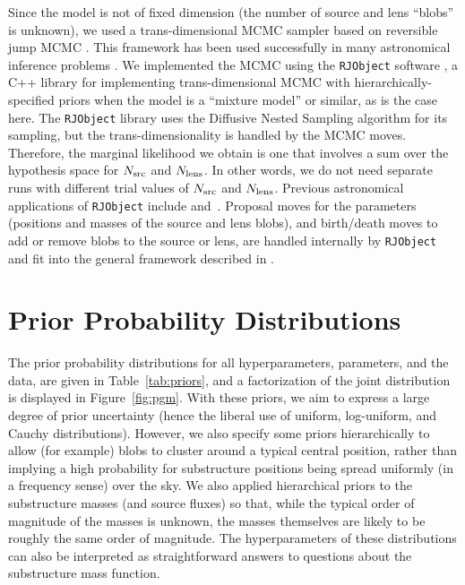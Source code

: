 \documentclass[useAMS,usenatbib]{mn2e}
\begin{document}
Since the model is not of fixed dimension (the number of source and lens
``blobs'' is unknown), we used a trans-dimensional MCMC sampler based on
reversible jump MCMC \citep{green}. This framework has been used successfully
in many astronomical inference problems \citep[e.g.][]{jones, renate}.
We implemented the MCMC using the
{\tt RJObject} software \citep{rjobject}, a C++ library for implementing trans-dimensional MCMC with hierarchically-specified priors when the model is
a ``mixture model'' or similar, as is the case here.
The {\tt RJObject} library uses the
Diffusive Nested Sampling algorithm \citep[DNS][]{dnest} for its sampling, but the
trans-dimensionality is handled by the MCMC moves. Therefore, the marginal
likelihood we obtain is one that involves a sum over the hypothesis space
for $N_{\rm src}$ and $N_{\rm lens}$. In other words, we do not need
separate runs with different trial values of $N_{\rm src}$ and $N_{\rm lens}$.
Previous astronomical
applications of {\tt RJObject} include \citet{magnetron}
and~\citet{exoplanet}. Proposal moves for the parameters (positions and masses
of the source and lens blobs), and birth/death moves to add or remove blobs
to the source or lens, are handled internally by {\tt RJObject} and
fit into the general framework described in \citet{rjobject}.

\section{Prior Probability Distributions}\label{sec:priors}
The prior probability distributions for all hyperparameters, parameters, and
the data, are given in Table~\ref{tab:priors}, and a factorization of the
joint distribution is displayed in Figure~\ref{fig:pgm}. With these priors,
we aim to express a large degree of prior uncertainty (hence the liberal use
of uniform, log-uniform, and Cauchy distributions). However, we also specify
some priors hierarchically to allow (for example)
blobs to cluster around a typical central
position, rather than implying a high probability for substructure positions
being spread uniformly (in a frequency sense) over the sky. We also applied
hierarchical priors to the substructure masses (and source fluxes) so that, while
the typical order of magnitude of the masses is unknown, the masses
themselves are likely to be roughly the same order of magnitude. The
hyperparameters of these distributions can also be interpreted as
straightforward answers to questions about the substructure mass function.
\end{document}
